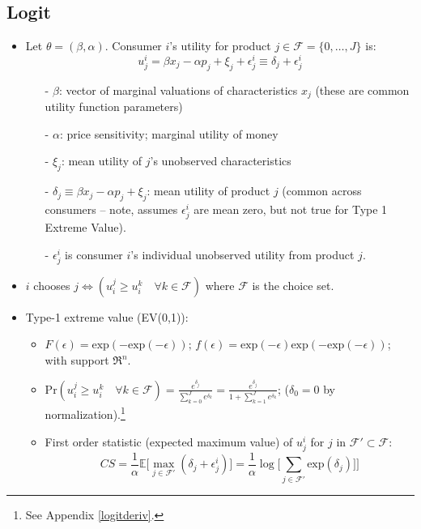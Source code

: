 \documentclass[11pt]{article}
\numberwithin{equation}{section}
\begin{document}
\subsection{Logit}

\begin{itemize}
	\item Let $\theta = (\beta, \alpha)$. Consumer $i$'s utility for product $j\in \mathscr{F} =\{0,\dots,J\}$ is:
	\begin{equation}
		u_j^i = \beta x_j - \alpha p_j + \xi_j + \epsilon_j^i \equiv \delta_j + \epsilon_j^i
	\end{equation}
	\begin{itemize}
		\item[-] $\beta$: vector of marginal valuations of characteristics $x_j$ (these are common utility function parameters)
		\item[-] $\alpha$: price sensitivity; marginal utility of money
		\item[-] $\xi_j$: mean utility of $j$'s unobserved characteristics
		\item[-] $ \delta_j \equiv \beta x_j - \alpha p_j + \xi_j $: mean utility of product $j$ (common across consumers -- note, assumes $\epsilon_j^i$ are mean zero, but not true for Type 1 Extreme Value).
		\item[-] $\epsilon_j^i$ is consumer $i$'s individual unobserved utility from product $j$.
	\end{itemize}
	\item $i$ chooses $j \iff (u_i^j \geq u_i^k\quad \forall k \in \mathscr{F})$ where $\mathscr{F}$ is the choice set.
	\item Type-1 extreme value (EV(0,1)):
	\begin{itemize}
		\item $F(\epsilon)=\text{exp}(-\text{exp}(-\epsilon));\, f(\epsilon)=\text{exp}(-\epsilon)\text{exp}(-\text{exp}(-\epsilon))$; with support $\Re^n$.
		\item $\text{Pr}(u_i^j \geq u_i^k\quad \forall k \in \mathscr{F}) = \frac{e^{\delta_j}}{\sum_{k=0}^{J}e^{\delta_k}} = \frac{e^{\delta_j}}{1 + \sum_{k=1}^{J}e^{\delta_k}}$; ($\delta_0=0$ by normalization).\footnote{See Appendix \ref{logitderiv}.}
		\item First order statistic (expected maximum value) of $u_j^i$ for $j$ in $\mathscr{F}'\subset\mathscr{F}$:
		\begin{equation}
			CS = \frac{1}{\alpha}\mathbb{E}\bigg[\max_{j\in \mathscr{F}'}(\delta_j + \epsilon_j^i)\bigg] = \frac{1}{\alpha}\log{\bigg[\sum_{j\in \mathscr{F}'}\text{exp}(\delta_j)]\bigg]}

\end{equation}
\end{itemize}
\end{itemize}
\end{document}

